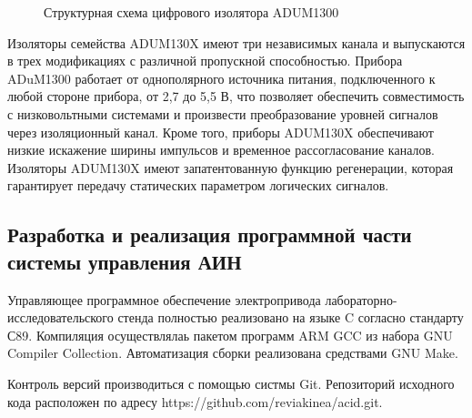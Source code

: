         \begin{figure}[h!]
            \caption{Структурная схема цифрового изолятора ADUM1300}
            \label{fig:adum1300}
        \end{figure}

        Изоляторы семейства ADUM130X имеют три независимых канала и выпускаются
        в трех модификациях с различной пропускной способностью. Прибора
        ADuM1300 работает от однополярного источника питания, подключенного к
        любой стороне прибора, от 2,7 до 5,5 В, что позволяет обеспечить
        совместимость с низковольтными системами и произвести преобразование
        уровней сигналов через изоляционный канал. Кроме того, приборы ADUM130X
        обеспечивают низкие искажение ширины импульсов и временное
        рассогласование каналов.  Изоляторы ADUM130X имеют запатентованную
        функцию регенерации, которая гарантирует передачу статических
        параметром логических сигналов.

    \subsection{Разработка и реализация программной части системы управления АИН}
        Управляющее программное обеспечение электропривода
        лабораторно-исследовательского стенда полностью реализовано на языке C
        согласно стандарту С89. Компиляция осуществлялаь пакетом программ ARM
        GCC из набора GNU Compiler Collection. Автоматизация сборки реализована
        средствами GNU Make.

        Контроль версий производиться с помощью систмы Git. Репозиторий
        исходного кода расположен по адресу
        https://github.com/reviakinea/acid.git.

